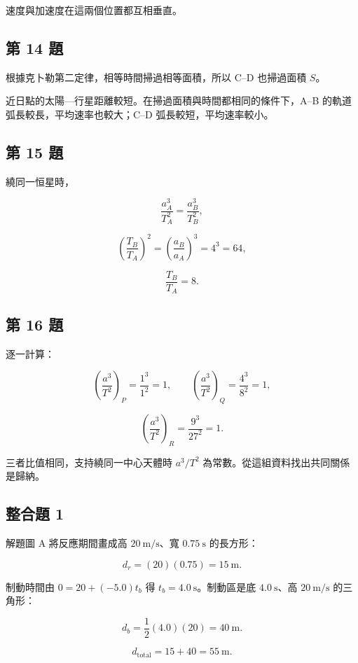 \documentclass[11pt,a4paper]{article}
\begin{document}
速度與加速度在這兩個位置都互相垂直。

\subsection{第 14 題}\label{ux7b2c-14-ux984c}

根據克卜勒第二定律，相等時間掃過相等面積，所以 C--D 也掃過面積 \(S\)。

近日點的太陽---行星距離較短。在掃過面積與時間都相同的條件下，A--B 的軌道弧長較長，平均速率也較大；C--D 弧長較短，平均速率較小。

\subsection{第 15 題}\label{ux7b2c-15-ux984c}

繞同一恒星時，

\[
\frac{a_A^3}{T_A^2}=\frac{a_B^3}{T_B^2},
\]

\[
\left(\frac{T_B}{T_A}\right)^2
=\left(\frac{a_B}{a_A}\right)^3
=4^3=64,
\]

\[
\frac{T_B}{T_A}=8.
\]

\subsection{第 16 題}\label{ux7b2c-16-ux984c}

逐一計算：

\[
\left(\frac{a^3}{T^2}\right)_P=\frac{1^3}{1^2}=1,
\qquad
\left(\frac{a^3}{T^2}\right)_Q=\frac{4^3}{8^2}=1,
\]

\[
\left(\frac{a^3}{T^2}\right)_R=\frac{9^3}{27^2}=1.
\]

三者比值相同，支持繞同一中心天體時 \(a^3/T^2\) 為常數。從這組資料找出共同關係是歸納。

\subsection{整合題 1}\label{ux6574ux5408ux984c-1}

解題圖 A 將反應期間畫成高 \(20\ \mathrm{m/s}\)、寬 \(0.75\ \mathrm s\) 的長方形：

\[
d_r=(20)(0.75)=15\ \mathrm m.
\]

制動時間由 \(0=20+(-5.0)t_b\) 得 \(t_b=4.0\ \mathrm s\)。制動區是底 \(4.0\ \mathrm s\)、高 \(20\ \mathrm{m/s}\) 的三角形：

\[
d_b=\frac{1}{2}(4.0)(20)=40\ \mathrm m.
\]

\[
d_{\mathrm{total}}=15+40=55\ \mathrm m.
\]
\end{document}
